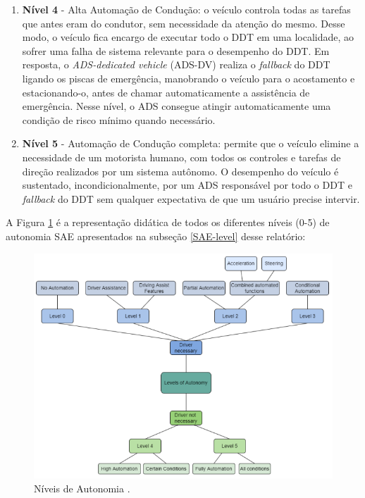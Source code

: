 \begin{enumerate}
\item \textbf{Nível 4} - Alta Automação de Condução: o veículo controla todas as tarefas que antes eram do condutor, sem necessidade da atenção do mesmo. Desse modo, o veículo fica encargo de executar todo o DDT em uma localidade, ao sofrer uma falha de sistema relevante para o desempenho do DDT. Em resposta, o \textit{ADS-dedicated vehicle} (ADS-DV) realiza o \textit{fallback} do DDT ligando os piscas de emergência, manobrando o veículo para o acostamento e estacionando-o, antes de chamar automaticamente a assistência de emergência. Nesse  nível, o ADS consegue atingir automaticamente uma condição de risco mínimo quando necessário.
\item \textbf{Nível 5} - Automação de Condução completa: permite que o veículo elimine a necessidade de um motorista humano, com todos os controles e tarefas de direção realizados por um sistema autônomo. O desempenho do veículo é sustentado, incondicionalmente, por um ADS responsável por todo o DDT e \textit{fallback} do DDT sem qualquer expectativa de que um usuário precise intervir.
\end{enumerate}
A Figura \ref{niveis-auto} é a representação didática de todos os diferentes níveis (0-5) de autonomia SAE apresentados na subseção \ref{SAE-level} desse relatório:
\begin{figure}[H]
\centering
\includegraphics[width=\textwidth]{Figures/level-auto.png}
\caption{Níveis de Autonomia \cite{review-auto}.}
\label{niveis-auto}
\end{figure}
